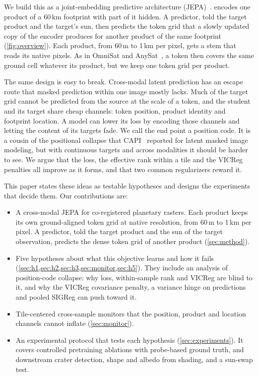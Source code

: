 We build this as a joint-embedding predictive architecture (JEPA)~\cite{assran2023self,bardes2024revisiting}. \method encodes one product of a 60\,km footprint with part of it hidden. A predictor, told the target product and the target's sun, then predicts the token grid that a slowly updated copy of the encoder produces for another product of the same footprint (\cref{fig:overview}). Each product, from 60\,m to 1\,km per pixel, gets a stem that reads its native pixels. As in OmniSat and AnySat~\cite{astruc2024omnisat,astruc2025anysat}, a token then covers the same ground cell whatever its product, but we keep one token grid per product.

The same design is easy to break. Cross-modal latent prediction has an escape route that masked prediction within one image mostly lacks. Much of the target grid cannot be predicted from the source at the scale of a token, and the student and its target share cheap channels: token position, product identity and footprint location. A model can lower its loss by encoding those channels and letting the content of its targets fade. We call the end point a position code. It is a cousin of the positional collapse that CAPI~\cite{darcet2025cluster} reported for latent masked image modeling, but with continuous targets and across modalities it should be harder to see. We argue that the loss, the effective rank within a tile and the VICReg penalties all improve as it forms, and that two common regularizers reward it.

This paper states these ideas as testable hypotheses and designs the experiments that decide them. Our contributions are:
\begin{itemize}[leftmargin=*,itemsep=1pt,topsep=2pt]
  \item A cross-modal JEPA for co-registered planetary rasters. Each product keeps its own ground-aligned token grid at native resolution, from 60\,m to 1\,km per pixel. A predictor, told the target product and the sun of the target observation, predicts the dense token grid of another product (\cref{sec:method}).
  \item Five hypotheses about what this objective learns and how it fails (\cref{sec:h1,sec:h2,sec:h3,sec:monitor,sec:h5}). They include an analysis of position-code collapse: why loss, within-sample rank and VICReg are blind to it, and why the VICReg covariance penalty, a variance hinge on predictions and pooled SIGReg can push toward it.
  \item Tile-centered cross-sample monitors that the position, product and location channels cannot inflate (\cref{sec:monitor}).
  \item An experimental protocol that tests each hypothesis (\cref{sec:experiments}). It covers controlled pretraining ablations with probe-based ground truth, and downstream crater detection, shape and albedo from shading, and a sun-swap test. 
\end{itemize}
